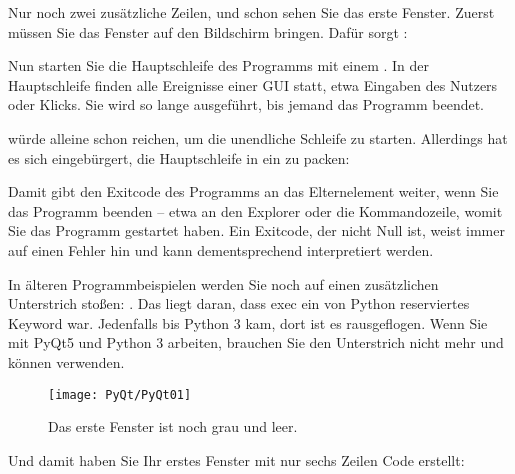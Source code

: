 Nur noch zwei zusätzliche Zeilen, und schon sehen Sie das erste Fenster. Zuerst müssen Sie das Fenster auf den Bildschirm bringen. Dafür sorgt :

\medskip
    

\medskip

Nun starten Sie die Hauptschleife des Programms mit einem . In der Hauptschleife finden alle Ereignisse einer GUI statt, etwa Eingaben des Nutzers oder Klicks. Sie wird so lange ausgeführt, bis jemand das Programm beendet.
    
 würde alleine schon reichen, um die unendliche Schleife zu starten. Allerdings hat es sich eingebürgert, die Hauptschleife in ein  zu packen:
    
\medskip


\medskip

Damit gibt  den Exitcode des Programms an das Elternelement weiter, wenn Sie das Programm beenden -- etwa an den Explorer oder die Kommandozeile, womit Sie das Programm gestartet haben. Ein Exitcode, der nicht Null ist, weist immer auf einen Fehler hin und kann dementsprechend interpretiert werden.
    
In älteren Programmbeispielen werden Sie noch auf einen zusätzlichen Unterstrich stoßen: . Das liegt daran, dass exec ein von Python reserviertes Keyword war. Jedenfalls bis Python 3 kam, dort ist es rausgeflogen. Wenn Sie mit PyQt5 und Python 3 arbeiten, brauchen Sie den Unterstrich nicht mehr und können  verwenden.
    
\begin{figure}
  \texttt{[image: PyQt/PyQt01]}    
  \caption{Das erste Fenster ist noch grau und leer.}\label{PyQt01}
\end{figure}     

    
Und damit haben Sie Ihr erstes Fenster mit nur sechs Zeilen Code erstellt:
    
\medskip



\PYTHON{}

    
\PYTHON{}


